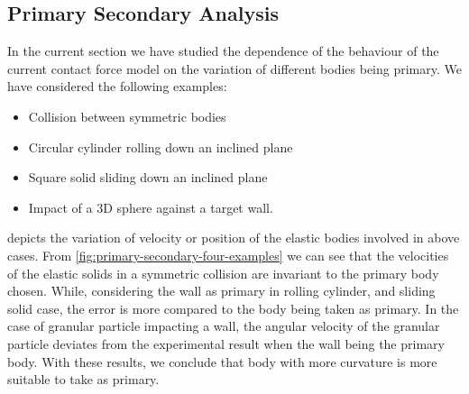 \FloatBarrier%
\subsection{Primary Secondary Analysis}
\label{sec:results-primary-secondary-analysis}

In the current section we have studied the dependence of the behaviour of the
current contact force model on the variation of different bodies being primary.
We have considered the following examples:
\begin{itemize}
\item Collision between symmetric bodies
\item Circular cylinder rolling down an inclined plane
\item Square solid sliding down an inclined plane
\item Impact of a 3D sphere against a target wall.
\end{itemize}
 depicts the variation of velocity
or position of the elastic bodies involved in above cases. From
\cref{fig:primary-secondary-four-examples} we can see that the velocities of
the elastic solids in a symmetric collision are invariant to the primary body
chosen. While, considering the wall as primary in rolling cylinder, and
sliding solid case, the error is more compared to the body being taken as
primary. In the case of granular particle impacting a wall, the angular
velocity of the granular particle deviates from the experimental result when
the wall being the primary body. With these results, we conclude that body
with more curvature is more suitable to take as primary.
